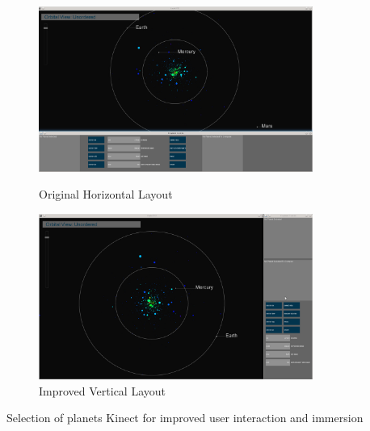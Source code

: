 \begin{figure}[h!]
  \centering
      \includegraphics[width=0.8\textwidth]{images/layout_horizontal.jpg}
  \caption{Original Horizontal Layout}  
        \includegraphics[width=0.8\textwidth]{images/layout_vertical.jpg}
  \caption{Improved Vertical Layout}
\end{figure}

Selection of planets
Kinect for improved user interaction and immersion